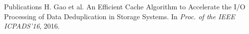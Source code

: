 \documentclass{resume} %
\begin{document}

%
%
%
%

\begin{rSection}{Publications}
H. Gao et al. An Efficient Cache Algorithm to Accelerate the I/O Processing of Data Deduplication in Storage Systems. In \textit{Proc. of the IEEE ICPADS’16}, 2016.
\end{rSection}

%




\end{document}
